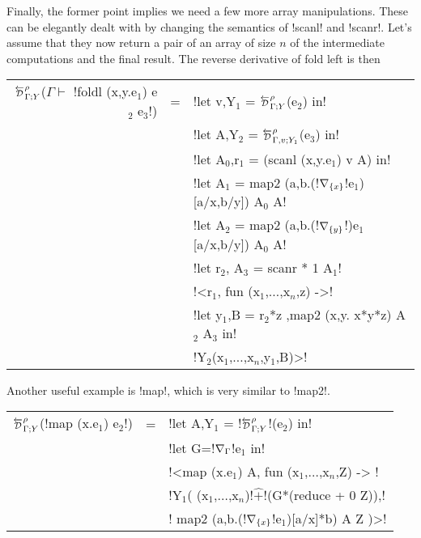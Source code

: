 Finally, the former point implies we need a few more array manipulations.
These can be elegantly dealt with by changing the semantics of !scanl! and !scanr!. 
Let's assume that they now return a pair of an array of size $n$ 
of the intermediate computations and the final result.
The reverse derivative of fold left is then

\begin{center}
\begin{tabular}{r c l}
    $\directD{\rho}{\Gamma}{Y}$($\Gamma\vdash $ !foldl (x,y.e$_1$) e$_2$ e$_3$!) &=&
            !let v,Y$_1$ = $\directD{\rho}{\Gamma}{Y}$(e$_2$) in! \\
            && !let A,Y$_2$ = $\directD{\rho}{\Gamma,v}{Y_1}$(e$_3$) in! \\
            && !let A$_0$,r$_1$ = (scanl (x,y.e$_1$) v A) in! \\
            && !let A$_1$ = map2 (a,b.(!$\nabla_{\{x\}}$!e$_1$)[a/x,b/y]) A$_0$ A! \\
            && !let A$_2$ = map2 (a,b.(!$\nabla_{\{y\}}$!)e$_1$[a/x,b/y]) A$_0$ A! \\
            && !let r$_2$, A$_3$ = scanr * 1 A$_1$! \\
            && !<r$_1$, fun (x$_1$,$\ldots$,x$_n$,z) ->! \\
            && !let y$_1$,B = r$_2$*z ,map2 (x,y. x*y*z) A$_2$ A$_3$ in! \\
            && !Y$_2$(x$_1$,$\ldots$,x$_n$,y$_1$,B)>! \\
\end{tabular}
\end{center}

Another useful example is !map!, which is very similar to !map2!.

\begin{center}
    \begin{tabular}{r c l}
        $\directD{\rho}{\Gamma}{Y}$(!map (x.e$_{1}$) e$_{2}$!) &=&  
            !let A,Y$_{1}$ = !$\directD{\rho}{\Gamma}{Y}$!(e$_{2}$) in! \\
            && !let G=!$\nabla_{\Gamma}$!e$_{1}$ in!\\
            && !<map (x.e$_{1}$) A, fun (x$_{1}$,$\ldots$,x$_n$,Z) -> !\\
            && !Y$_{1}$( (x$_{1}$,$\ldots$,x$_n$)!$\widehat{+}$!(G*(reduce + 0 Z)),!\\
            && \quad\quad! map2 (a,b.(!$\nabla_{\{x\}}$!e$_{1}$)[a/x]*b) A Z )>!\\
    \end{tabular}
\end{center}

